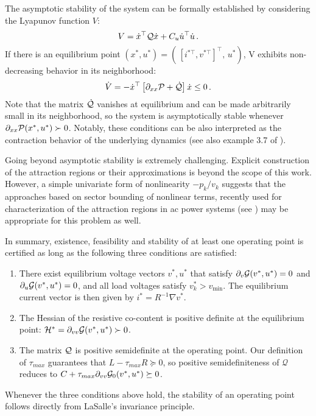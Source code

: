 \documentclass[letterpaper, 10 pt, conference]{ieeeconf}
\begin{document}
The asymptotic stability of the system can be formally established by considering the Lyapunov function $V$:
\begin{equation}\label{eq:lyap}
    V = \dot{x}^\top {\cal Q} \dot{x} + C_u \dot{u}^\top\dot u\,.
\end{equation} 
If there is an equilibrium point $(x^*, u^*) = (\,[i^{*\top},  v^{*\top}]^\top,\, u^*)$, V exhibits non-decreasing behavior in its neighborhood:
\begin{equation}
    \dot{V} = -\dot{x}^\top\left[\partial_{xx}{\cal P} + \dot{{\cal Q}}\right]\dot{x} \leq 0\,.
\end{equation}
Note that the matrix $\dot{{\cal Q}}$ vanishes at equilibrium and can be made arbitrarily small in its neighborhood, so the system is asymptotically stable whenever $\partial_{xx} {\cal P}(x^*, u^*) \succ 0$. Notably, these conditions can be also interpreted as the contraction behavior of the underlying dynamics \cite{Feijer:2010ia,lohmiller1998contraction} (see also example 3.7 of \cite{slotine2003modular}).

Going beyond asymptotic stability is extremely challenging. Explicit construction of the attraction regions or their approximations is beyond the scope of this work. However, a simple univariate form of nonlinearity $-p_k/v_k$ suggests that the approaches based on sector bounding of nonlinear terms, recently used for characterization of the attraction regions in ac power systems (see \cite{Vu:2015uv, Vu:2015vfb}) may be appropriate for this problem as well.

In summary, existence, feasibility and stability of at least one operating point is certified as long as the following three conditions are satisfied:
\begin{enumerate}
	\item There exist equilibrium voltage vectors $v^*, u^*$ that satisfy $\partial_v{\cal G}(v^*, u^*) = 0$ and $\partial_u {\cal G}(v^*, u^*) = 0$, and all load voltages satisfy $v_k^* > v_{\min}$. The equilibrium current vector is then given by $i^* = R^{-1}\nabla v^*$. 
    \item The Hessian of the resistive co-content is positive definite at the equilibrium point: ${\cal H}^* = \partial_{vv}{\cal G}(v^*, u^*) \succ 0$.
    \item The matrix ${\cal Q}$ is positive semidefinite at the operating point. Our definition of $\tau_{max}$ guarantees that $L -\tau_{max} R \succeq 0$, so positive semidefiniteness of $\mathcal{Q}$ reduces to $ C + \tau_{max} \partial_{vv} {\cal G}_0(v^*,u^*) \succeq 0$.
\end{enumerate}
Whenever the three conditions above hold, the stability of an operating point follows directly from LaSalle's invariance principle.
\end{document}
